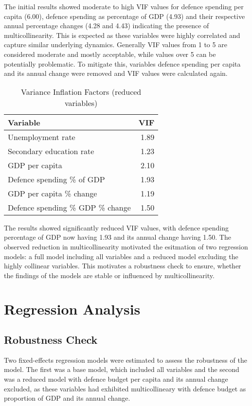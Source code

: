 The initial results showed moderate to high VIF values for defence spending per capita (6.00), 
defence spending as percentage of GDP (4.93) and their respective annual percentage changes (4.28 and 4.43)
indicating the presence of multicollinearity. This is expected as these variables were highly correlated 
and capture similar underlying dynamics.
Generally VIF values from 1 to 5 are considered 
moderate and mostly acceptable, while values over 5 can be potentially problematic. To mitigate 
this, variables defence spending per capita and its annual change were removed and VIF values 
were calculated again.

\begin{table}[ht]
\caption{Variance Inflation Factors (reduced variables)}
\small
\centering
\begin{tabularx}{\textwidth}{l r}
\toprule
\textbf{Variable} & \textbf{VIF} \\
\midrule
Unemployment rate & 1.89 \\
Secondary education rate & 1.23 \\
GDP per capita & 2.10 \\
Defence spending \% of GDP & 1.93 \\
GDP per capita \% change & 1.19 \\
Defence spending \% GDP \% change & 1.50 \\
\bottomrule
\end{tabularx}
\label{tab:multicollinearity_reduced}
\end{table}

The results showed significantly reduced VIF values, with defence spending percentage of GDP now having 
1.93 and its annual change having 1.50. The observed reduction in multicollinearity motivated the 
esitmation of two regression models: a full model including all variables and a reduced model 
excluding the highly collinear variables. This motivates a robustness check to ensure, whether 
the findings of the models are stable or influenced by multicollinearity.

\section{Regression Analysis}

\subsection{Robustness Check}

Two fixed-effects regression models were estimated to assess the robustness of the model. 
The first was a base model, 
which included all variables and the second was a reduced model with defence budget 
per capita and its annual change excluded, as these variables had exhibited multicollineary 
with defence budget as proportion of GDP and its annual change.


